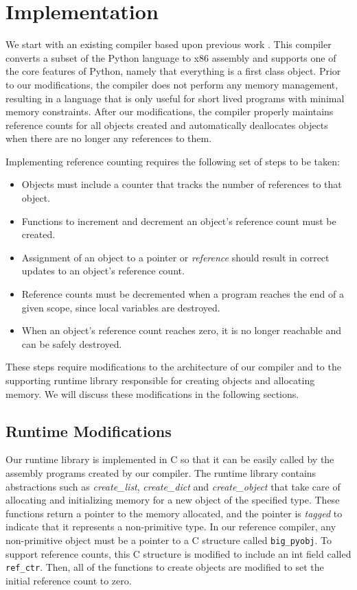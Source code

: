 \documentclass{sigplanconf}
\newcommand{\afunction}[1]{\textit{#1}}
\newcommand{\atype}[1]{\texttt{#1}}
\newcommand{\afield}[1]{\texttt{#1}}
\begin{document}
\section{Implementation}
\label{sec:implementation}

We start with an existing compiler based upon previous work \cite{siek}.  This compiler converts a subset of the Python language to x86 assembly and supports one of the core features of Python, namely that everything is a first class object.  Prior to our modifications, the compiler does not perform any memory management, resulting in a language that is only useful for short lived programs with minimal memory constraints.  After our modifications, the compiler properly maintains reference counts for all objects created and automatically deallocates objects when there are no longer any references to them.

Implementing reference counting requires the following set of steps to be taken:

\begin{itemize}
\item Objects must include a counter that tracks the number of references to that object.
\item Functions to increment and decrement an object's reference count must be created.
\item Assignment of an object to a pointer or \textit{reference} should result in correct updates to an object's reference count.
\item Reference counts must be decremented when a program reaches the end of a given scope, since local variables are destroyed.
\item When an object's reference count reaches zero, it is no longer reachable and can be safely destroyed.

\end{itemize}

These steps require modifications to the architecture of our compiler and to the supporting runtime library responsible for creating objects and allocating memory.  We will discuss these modifications in the following sections.

\subsection{Runtime Modifications}
Our runtime library is implemented in C so that it can be easily called by the assembly programs created by our compiler.  The runtime library contains abstractions such as \afunction{create\_list}, \afunction{create\_dict} and \afunction{create\_object} that take care of allocating and initializing memory for a new object of the specified type.  These functions return a pointer to the memory allocated, and the pointer is \textit{tagged} to indicate that it represents a non-primitive type.  In our reference compiler, any non-primitive object must be a pointer to a C structure called \atype{big\_pyobj}.  To support reference counts, this C structure is modified to include an int field called \afield{ref\_ctr}.  Then, all of the functions to create objects are modified to set the initial reference count to zero.
\end{document}
